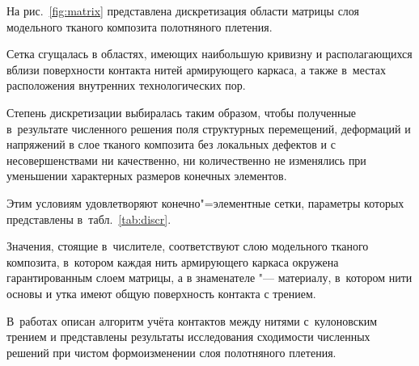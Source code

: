 На рис.~\ref{fig:matrix} представлена дискретизация области матрицы слоя модельного тканого композита полотняного плетения. 

Сетка сгущалась в областях, имеющих наибольшую кривизну и располагающихся вблизи поверхности контакта нитей армирующего каркаса, а также в~местах расположения внутренних технологических пор. 

Степень дискретизации выбиралась таким образом, чтобы полученные в~результате численного решения поля структурных перемещений, деформаций и напряжений в слое тканого композита без локальных дефектов и с несовершенствами ни качественно, ни количественно не изменялись при уменьшении характерных размеров конечных элементов.

Этим условиям удовлетворяют конечно"=элементные сетки, параметры которых представлены в~табл.~\ref{tab:discr}. 

Значения, стоящие в~числителе, соответствуют слою модельного тканого композита, в~котором каждая нить армирующего каркаса окружена гарантированным слоем матрицы, а в знаменателе "--- материалу, в~котором нити основы и утка имеют общую поверхность контакта с трением. 

В~работах \cite{dedkov:bib:dedkov, dedkov:bib:dedkov2} описан алгоритм учёта контактов между нитями с~кулоновским трением и представлены результаты исследования сходимости численных решений при чистом формоизменении слоя полотняного плетения.





